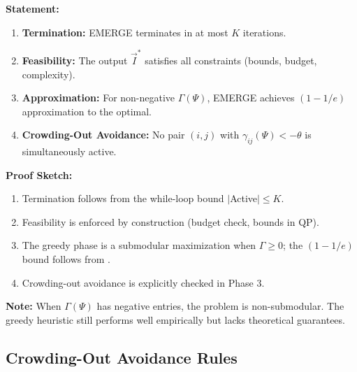 \begin{tcolorbox}[colback=purple!5!white, colframe=purple!75!black,
    title=\textbf{Theorem EIT-T14: EMERGE Algorithm Properties}]

\textbf{Statement:}
\begin{enumerate}
    \item \textbf{Termination:} EMERGE terminates in at most $K$ iterations.
    \item \textbf{Feasibility:} The output $\vec{I}^*$ satisfies all constraints (bounds, budget, complexity).
    \item \textbf{Approximation:} For non-negative $\Gamma(\Psi)$, EMERGE achieves $(1 - 1/e)$ approximation to the optimal.
    \item \textbf{Crowding-Out Avoidance:} No pair $(i,j)$ with $\gamma_{ij}(\Psi) < -\theta$ is simultaneously active.
\end{enumerate}

\textbf{Proof Sketch:}
\begin{enumerate}
    \item Termination follows from the while-loop bound $|$Active$| \leq K$.
    \item Feasibility is enforced by construction (budget check, bounds in QP).
    \item The greedy phase is a submodular maximization when $\Gamma \geq 0$; the $(1-1/e)$ bound follows from \citet{nemhauser1978analysis}.
    \item Crowding-out avoidance is explicitly checked in Phase 3.
\end{enumerate}

\textbf{Note:} When $\Gamma(\Psi)$ has negative entries, the problem is non-submodular. The greedy heuristic still performs well empirically but lacks theoretical guarantees.

\end{tcolorbox}

\subsection{Crowding-Out Avoidance Rules}
\label{subsec:crowding-out-rules}

